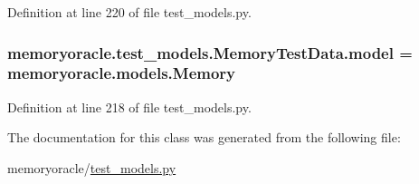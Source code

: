 Definition at line 220 of file test\+\_\+models.\+py.

\hypertarget{classmemoryoracle_1_1test__models_1_1MemoryTestData_a39f9d2a45b4f7cd7bb7884623add7f66}{}
\subsubsection[{model}]{\setlength{\rightskip}{0pt plus 5cm}memoryoracle.\+test\+\_\+models.\+Memory\+Test\+Data.\+model = {\bf memoryoracle.\+models.\+Memory}\hspace{0.3cm}{\ttfamily [static]}}\label{classmemoryoracle_1_1test__models_1_1MemoryTestData_a39f9d2a45b4f7cd7bb7884623add7f66}


Definition at line 218 of file test\+\_\+models.\+py.



The documentation for this class was generated from the following file\+:\begin{DoxyCompactItemize}
\item 
memoryoracle/\hyperlink{test__models_8py}{test\+\_\+models.\+py}\end{DoxyCompactItemize}
